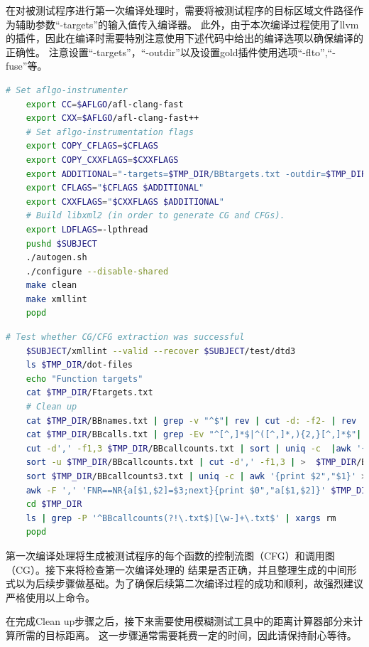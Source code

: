 \documentclass[bachelor]{njupthesis}
\begin{document}
在对被测试程序进行第一次编译处理时，需要将被测试程序的目标区域文件路径作为辅助参数“-targets”的输入值传入编译器。
此外，由于本次编译过程使用了llvm的插件，因此在编译时需要特别注意使用下述代码中给出的编译选项以确保编译的正确性。
注意设置“-targets”，“-outdir”以及设置gold插件使用选项“-flto”,“-fuse”等。
\begin{lstlisting}[language=bash]
	# Set aflgo-instrumenter
	export CC=$AFLGO/afl-clang-fast
	export CXX=$AFLGO/afl-clang-fast++
	# Set aflgo-instrumentation flags
	export COPY_CFLAGS=$CFLAGS
	export COPY_CXXFLAGS=$CXXFLAGS
	export ADDITIONAL="-targets=$TMP_DIR/BBtargets.txt -outdir=$TMP_DIR -flto -fuse-ld=gold -Wl,-plugin-opt=save-temps"
	export CFLAGS="$CFLAGS $ADDITIONAL"
	export CXXFLAGS="$CXXFLAGS $ADDITIONAL"
	# Build libxml2 (in order to generate CG and CFGs).
	export LDFLAGS=-lpthread
	pushd $SUBJECT
  	./autogen.sh
  	./configure --disable-shared
  	make clean
  	make xmllint
	popd
\end{lstlisting}

\begin{lstlisting}[language=bash]
	# Test whether CG/CFG extraction was successful
	$SUBJECT/xmllint --valid --recover $SUBJECT/test/dtd3
	ls $TMP_DIR/dot-files
	echo "Function targets"
	cat $TMP_DIR/Ftargets.txt
	# Clean up
	cat $TMP_DIR/BBnames.txt | grep -v "^$"| rev | cut -d: -f2- | rev | sort | uniq > $TMP_DIR/BBnames2.txt && mv $TMP_DIR/BBnames2.txt $TMP_DIR/BBnames.txt
	cat $TMP_DIR/BBcalls.txt | grep -Ev "^[^,]*$|^([^,]*,){2,}[^,]*$"| sort | uniq > $TMP_DIR/BBcalls2.txt && mv $TMP_DIR/BBcalls2.txt $TMP_DIR/BBcalls.txt
	cut -d',' -f1,3 $TMP_DIR/BBcallcounts.txt | sort | uniq -c  |awk '{print $2","$1}' > $TMP_DIR/BBcallcounts2.txt
	sort -u $TMP_DIR/BBcallcounts.txt | cut -d',' -f1,3 | >  $TMP_DIR/BBcallcounts3.txt
	sort $TMP_DIR/BBcallcounts3.txt | uniq -c | awk '{print $2","$1}' > $TMP_DIR/BBcallcounts4.txt && mv $TMP_DIR/BBcallcounts4.txt $TMP_DIR/BBcallcounts3.txt
	awk -F ',' 'FNR==NR{a[$1,$2]=$3;next}{print $0","a[$1,$2]}' $TMP_DIR/BBcallcounts3.txt $TMP_DIR/BBcallcounts2.txt  > $TMP_DIR/BBcallcounts.txt
	cd $TMP_DIR 
	ls | grep -P '^BBcallcounts(?!\.txt$)[\w-]+\.txt$' | xargs rm
	popd
\end{lstlisting}

第一次编译处理将生成被测试程序的每个函数的控制流图（CFG）和调用图（CG）。接下来将检查第一次编译处理的
结果是否正确，并且整理生成的中间形式以为后续步骤做基础。为了确保后续第二次编译过程的成功和顺利，故强烈建议严格使用以上命令。


在完成Clean up步骤之后，接下来需要使用模糊测试工具中的距离计算器部分来计算所需的目标距离。
这一步骤通常需要耗费一定的时间，因此请保持耐心等待。
\end{document}
